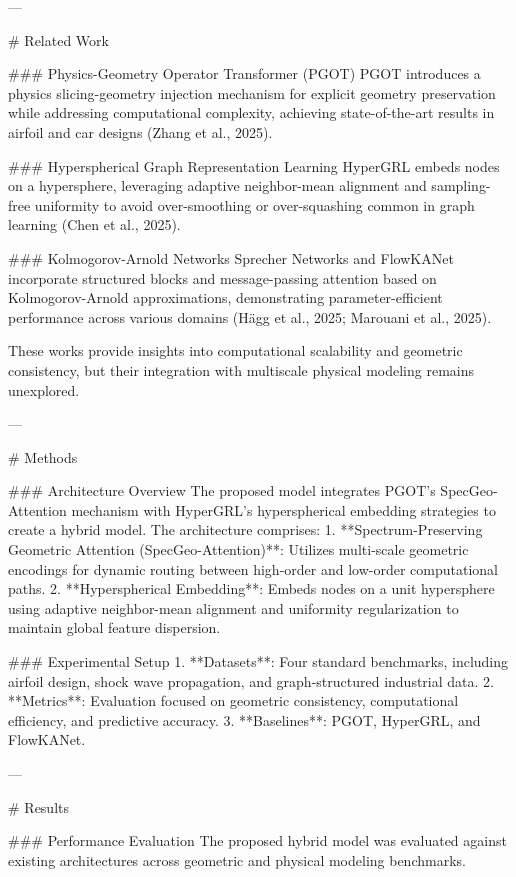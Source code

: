 ---

# Related Work  

### Physics-Geometry Operator Transformer (PGOT)  
PGOT introduces a physics slicing-geometry injection mechanism for explicit geometry preservation while addressing computational complexity, achieving state-of-the-art results in airfoil and car designs (Zhang et al., 2025).  

### Hyperspherical Graph Representation Learning  
HyperGRL embeds nodes on a hypersphere, leveraging adaptive neighbor-mean alignment and sampling-free uniformity to avoid over-smoothing or over-squashing common in graph learning (Chen et al., 2025).  

### Kolmogorov-Arnold Networks  
Sprecher Networks and FlowKANet incorporate structured blocks and message-passing attention based on Kolmogorov-Arnold approximations, demonstrating parameter-efficient performance across various domains (Hägg et al., 2025; Marouani et al., 2025).  

These works provide insights into computational scalability and geometric consistency, but their integration with multiscale physical modeling remains unexplored.  

---

# Methods  

### Architecture Overview  
The proposed model integrates PGOT's SpecGeo-Attention mechanism with HyperGRL's hyperspherical embedding strategies to create a hybrid model. The architecture comprises:  
1. **Spectrum-Preserving Geometric Attention (SpecGeo-Attention)**: Utilizes multi-scale geometric encodings for dynamic routing between high-order and low-order computational paths.  
2. **Hyperspherical Embedding**: Embeds nodes on a unit hypersphere using adaptive neighbor-mean alignment and uniformity regularization to maintain global feature dispersion.  

### Experimental Setup  
1. **Datasets**: Four standard benchmarks, including airfoil design, shock wave propagation, and graph-structured industrial data.  
2. **Metrics**: Evaluation focused on geometric consistency, computational efficiency, and predictive accuracy.  
3. **Baselines**: PGOT, HyperGRL, and FlowKANet.  

---

# Results  

### Performance Evaluation  
The proposed hybrid model was evaluated against existing architectures across geometric and physical modeling benchmarks.  

